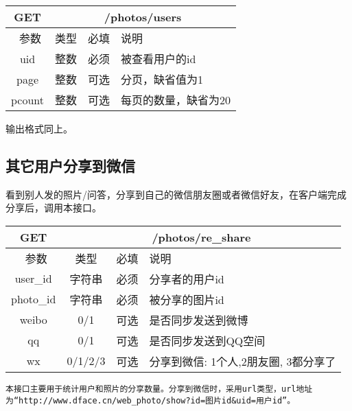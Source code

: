 \begin{table}[H]
   \begin{center}
\begin{tabular}{|c|c|c|p{12cm}|}
\hline
GET & \multicolumn{3}{|c|}{/photos/users} \\
\hline\hline
 \  参数  & 类型 & 必填 &  说明  \\
 \hline
 uid  & 整数 & 必须 & 被查看用户的id\\ 
\hline
 page  & 整数 & 可选 & 分页，缺省值为1\\ 
 \hline
 pcount  & 整数 & 可选 & 每页的数量，缺省为20\\ 
\hline
\end{tabular}
   \end{center}
\end{table}

输出格式同上。



\subsection{其它用户分享到微信}
看到别人发的照片/问答，分享到自己的微信朋友圈或者微信好友，在客户端完成分享后，调用本接口。

\begin{table}[H]
   \begin{center}
\begin{tabular}{|c|c|c|p{12cm}|}
\hline
GET & \multicolumn{3}{|c|}{/photos/re\_share} \\
\hline\hline
 \  参数  & 类型 & 必填 &  说明  \\
 \hline
 user\_id  & 字符串 & 必须 & 分享者的用户id\\ 
  \hline
 photo\_id  & 字符串 & 必须 & 被分享的图片id\\ 
 \hline
 weibo  & 0/1 & 可选  &  是否同步发送到微博\\
  \hline
 qq  & 0/1 & 可选  &  是否同步发送到QQ空间\\
  \hline
 wx  & 0/1/2/3 & 可选  &  分享到微信: 1个人,2朋友圈, 3都分享了\\
\hline
\end{tabular}
   \end{center}
\end{table}

\begin{verbatim}
本接口主要用于统计用户和照片的分享数量。分享到微信时，采用url类型，url地址为“http://www.dface.cn/web_photo/show?id=图片id&uid=用户id”。
\end{verbatim}



